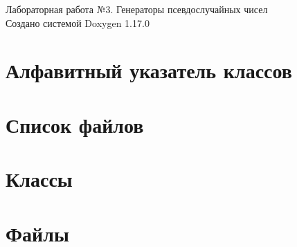 \documentclass[twoside]{book}
\newcommand{\+}{\discretionary{\mbox{\scriptsize$\hookleftarrow$}}{}{}}
\newcommand{\clearemptydoublepage}{%
    \newpage{\pagestyle{empty}\cleardoublepage}%
  }
\begin{document}
  \raggedbottom
    \hypersetup{pageanchor=false,
                bookmarksnumbered=true,
                pdfencoding=unicode
               }
  \begin{titlepage}
  \vspace*{7cm}
  \begin{center}%
  {\Large Лабораторная работа №3. Генераторы псевдослучайных чисел}\\
  \vspace*{1cm}
  {\large Создано системой Doxygen 1.17.0}\\
  \end{center}
  \end{titlepage}
  \clearemptydoublepage
  \tableofcontents
  \clearemptydoublepage
  \hypersetup{pageanchor=true}

\chapter{Алфавитный указатель классов}

\chapter{Список файлов}

\chapter{Классы}





\chapter{Файлы}



  \backmatter
  \newpage
  \clearemptydoublepage
  \printindex
\end{document}
